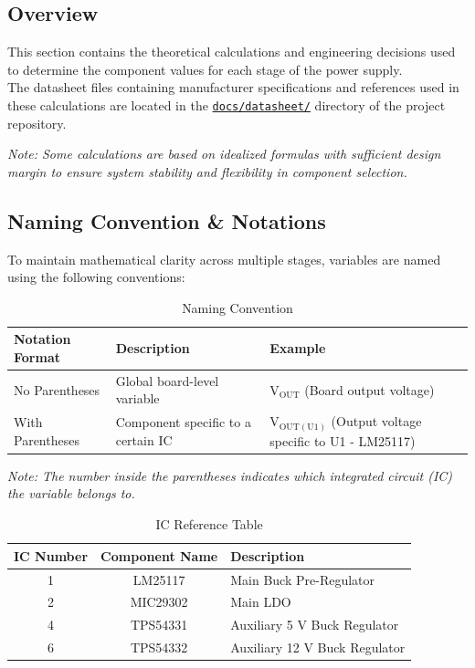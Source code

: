 \documentclass[11pt, a4paper]{article}
\begin{document}
\subsection{Overview}
This section contains the theoretical calculations and engineering decisions used to determine the component values for each stage of the power supply. \\[0.5em]
The datasheet files containing manufacturer specifications and references used in these calculations are located in the \small\href{https://github.com/BaranGuvendiren/digital-bench-power-supply/tree/main/docs/datasheets}{\texttt{docs/datasheet/}} directory of the project repository. \\[1em]
{\small\itshape Note: Some calculations are based on idealized formulas with sufficient design margin to ensure system stability and flexibility in component selection. \par}

\normalsize
\subsection{Naming Convention \& Notations}
To maintain mathematical clarity across multiple stages, variables are named using the following conventions:
\begin{table}[h]
\centering
\caption{Naming Convention}
\label{tab:convention}
\small
\begin{tabularx}{\textwidth}{|l|>{\raggedright\arraybackslash}X|l|}
\hline
\rowcolor{gray!20} 
\textbf{Notation Format} & \textbf{Description}               & \textbf{Example} \\ \hline
No Parentheses           & Global board-level variable        & $\mathrm{V_{OUT}}$ (Board output voltage) \\ \hline
With Parentheses         & Component specific to a certain IC & $\mathrm{V_{OUT(U1)}}$ (Output voltage specific to U1 - LM25117) \\ \hline
\end{tabularx}
\end{table}

{\small\itshape Note: The number inside the parentheses indicates which integrated circuit (IC) the variable belongs to. \par}

\begin{table}[h]
\centering
\caption{IC Reference Table}
\label{tab:notations}
\small
\begin{tabularx}{\textwidth}{|c|c|>{\raggedright\arraybackslash}X|}
\hline
\rowcolor{gray!20} 
\textbf{IC Number} & \textbf{Component Name} & \textbf{Description} \\ \hline
1                  & LM25117                 & Main Buck Pre-Regulator \\ \hline
2                  & MIC29302                & Main LDO \\ \hline
4                  & TPS54331                & Auxiliary 5 V Buck Regulator \\ \hline
6                  & TPS54332                & Auxiliary 12 V Buck Regulator \\ \hline
\end{tabularx}
\end{table}
\end{document}
